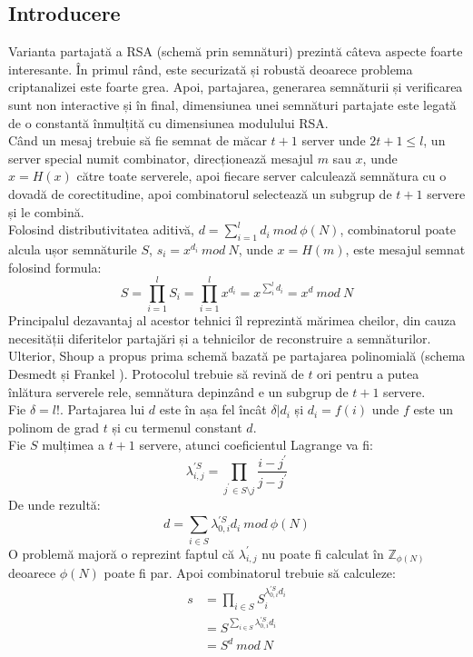 \documentclass[12pt, oneside]{book}
\begin{document}
\subsection{Introducere}
Varianta partajată a RSA (schemă prin semnături) prezintă câteva aspecte foarte interesante. În primul rând, este securizată și robustă deoarece problema criptanalizei este foarte grea. Apoi, partajarea, generarea semnăturii și verificarea sunt non interactive și în final, dimensiunea unei semnături partajate este legată de o constantă înmulțită cu dimensiunea modulului RSA. \\
Când un mesaj trebuie să fie semnat de măcar $ t+1 $ server unde $ 2t+1 \leq l $, un server special numit combinator, direcționează mesajul $m$ sau $x$, unde $x=H(x)$ către toate serverele, apoi fiecare server calculează semnătura cu o dovadă de corectitudine, apoi combinatorul selectează un subgrup de $t+1$ servere și le combină. \\
Folosind distributivitatea aditivă, $d=\sum_{i=1}^{l} d_i \ mod \ \phi(N)$, combinatorul poate alcula ușor semnăturile $S$, $s_i=x^{d_i} \ mod \ N$, unde $x=H(m)$, este mesajul semnat folosind formula:
$$ S= \prod_{i=1}^{l} S_i = \prod_{i=1}^{l} x^{d_i} = x^{\sum_{i}^{l} d_i} = x^d \ mod \ N $$
Principalul dezavantaj al acestor tehnici îl reprezintă mărimea cheilor, din cauza necesității diferitelor partajări și a tehnicilor de reconstruire a semnăturilor. Ulterior, Shoup a propus prima schemă bazată pe partajarea polinomială (schema Desmedt și Frankel \cite{desmet}). Protocolul trebuie să revină de $t$ ori pentru a putea înlătura serverele rele, semnătura depinzând e un subgrup de $t+1$ servere. \\
Fie $\delta =l!$. Partajarea lui $d$ este în așa fel încât $\delta | d_i$ și $d_i =f(i)$ unde $f$ este un polinom de grad $t$ și cu termenul constant $d$. \\
Fie $S$ mulțimea a $t+1$ servere, atunci coeficientul Lagrange va fi: 
$$ \lambda_{i,j}^{'S} = \prod_{j^{'} \in S \setminus j}^{} \frac{i-j^{'}}{j-j^{'}}   $$
De unde rezultă:
$$ d= \sum_{i \in S}^{} \lambda_{0,i}^{'S} d_i \ mod \ \phi(N)$$
O problemă majoră o reprezint faptul că $\lambda_{i,j}^{'}$ nu poate fi calculat în $\mathbb{Z}_{\phi(N)}$ deoarece $\phi(N)$ poate fi par. Apoi combinatorul trebuie să calculeze:
\begin{align*}
s&=\prod_{i \in S}^{} S_{i}^{\lambda_{0,i}^{'S} d_i}\\
 &= S^{\sum_{i \in S}^{}\lambda_{0,i}^{'S} d_i} \\
 &= S^d \ mod \ N
\end{align*}
\end{document}
